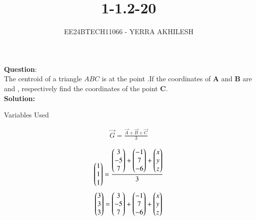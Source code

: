 \documentclass[journal]{IEEEtran}
\begin{document}

\vspace{3cm}

\title{1-1.2-20}
\author{EE24BTECH11066 - YERRA AKHILESH
}
{\let\newpage\relax\maketitle}

\renewcommand{\thefigure}{\theenumi}
\renewcommand{\thetable}{\theenumi}
\setlength{\intextsep}{10pt} %


\renewcommand{\thetable}{\theenumi}
\textbf{Question}:\\
The centroid of a triangle $ABC$ is at the point .If the coordinates of \textbf{A} and \textbf{B} are  and , respectively find the coordinates of the point \textbf{C}.
\\
\textbf{Solution: }
\begin{table}[h!]    
  \centering
  
  \caption{Variables Used}
  \label{tab1-1.2-20}
\end{table}
\begin{align}
    \vec{G}=\frac{\vec{A}+\vec{B}+\vec{C}}{3}\\
\end{align}    
\begin{align}    
\begin{pmatrix}1\\1\\1\end{pmatrix}=\frac{\begin{pmatrix}3\\-5\\7\end{pmatrix}+\begin{pmatrix}-1\\7\\-6\end{pmatrix}+\begin{pmatrix}x\\y\\z\end{pmatrix}}{3}\\
\end{align}
\begin{align}
\begin{pmatrix}3\\3\\3\end{pmatrix}=\begin{pmatrix}3\\-5\\7\end{pmatrix}+\begin{pmatrix}-1\\7\\-6\end{pmatrix}+\begin{pmatrix}x\\y\\z\end{pmatrix}\\
\end{align}
\end{document}
